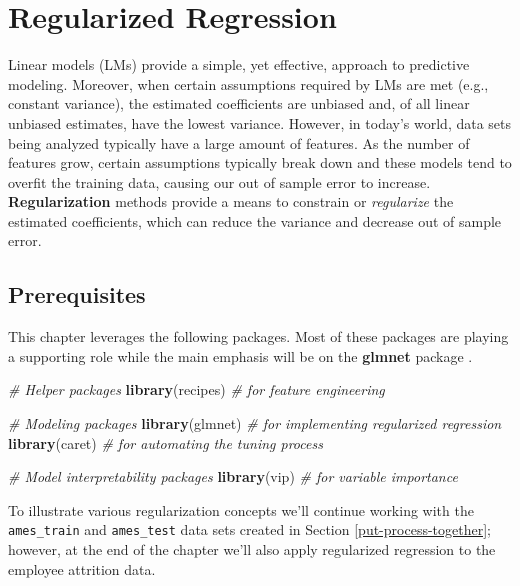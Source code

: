 \documentclass[]{krantz}
\makeatletter
\newenvironment{Shaded}{\begin{snugshade}}{\end{snugshade}}
\newcommand{\CommentTok}[1]{\textcolor[rgb]{0.37,0.37,0.37}{\textit{#1}}}
\newcommand{\KeywordTok}[1]{\textcolor[rgb]{0.27,0.27,0.27}{\textbf{#1}}}
\newcommand{\NormalTok}[1]{#1}
\newenvironment{kframe}{%
\medskip{}
\setlength{\fboxsep}{.8em}
 \def\at@end@of@kframe{}%
 \ifinner\ifhmode%
  \def\at@end@of@kframe{\end{minipage}}%
  \begin{minipage}{\columnwidth}%
 \fi\fi%
 \def\FrameCommand##1{\hskip\@totalleftmargin \hskip-\fboxsep
 \colorbox{shadecolor}{##1}\hskip-\fboxsep
     \hskip-\linewidth \hskip-\@totalleftmargin \hskip\columnwidth}%
 \MakeFramed {\advance\hsize-\width
   \@totalleftmargin\z@ \linewidth\hsize
   \@setminipage}}%
 {\par\unskip\endMakeFramed%
 \at@end@of@kframe}
\renewenvironment{Shaded}{\begin{kframe}}{\end{kframe}}
\makeatother
\begin{document}
\hypertarget{regularized-regression}{%
\chapter{Regularized Regression}\label{regularized-regression}}

Linear models (LMs) provide a simple, yet effective, approach to predictive modeling. Moreover, when certain assumptions required by LMs are met (e.g., constant variance), the estimated coefficients are unbiased and, of all linear unbiased estimates, have the lowest variance. However, in today's world, data sets being analyzed typically have a large amount of features. As the number of features grow, certain assumptions typically break down and these models tend to overfit the training data, causing our out of sample error to increase. \textbf{Regularization} methods provide a means to constrain or \emph{regularize} the estimated coefficients, which can reduce the variance and decrease out of sample error.

\hypertarget{prerequisites-4}{%
\section{Prerequisites}\label{prerequisites-4}}

This chapter leverages the following packages. Most of these packages are playing a supporting role while the main emphasis will be on the \textbf{glmnet} package \citep{R-glmnet}.

\begin{Shaded}
\begin{Highlighting}[]
\CommentTok{# Helper packages}
\KeywordTok{library}\NormalTok{(recipes)  }\CommentTok{# for feature engineering}

\CommentTok{# Modeling packages}
\KeywordTok{library}\NormalTok{(glmnet)   }\CommentTok{# for implementing regularized regression}
\KeywordTok{library}\NormalTok{(caret)    }\CommentTok{# for automating the tuning process}

\CommentTok{# Model interpretability packages}
\KeywordTok{library}\NormalTok{(vip)      }\CommentTok{# for variable importance}
\end{Highlighting}
\end{Shaded}

To illustrate various regularization concepts we'll continue working with the \texttt{ames\_train} and \texttt{ames\_test} data sets created in Section \ref{put-process-together}; however, at the end of the chapter we'll also apply regularized regression to the employee attrition data.
\end{document}
